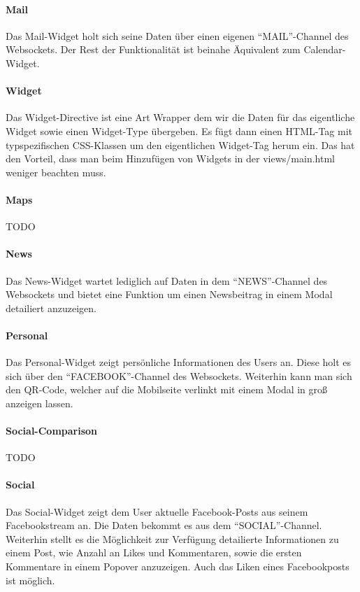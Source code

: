 \documentclass[10pt,a4paper]{report}
\newcommand{\code}[1]{{\fontfamily{cmvtt}\selectfont #1}}
\begin{document}
				\paragraph{Mail} 
					Das Mail-Widget holt sich seine Daten über einen eigenen "`MAIL"'-Channel des Websockets. Der Rest der Funktionalität ist beinahe Äquivalent zum Calendar-Widget.
				\paragraph{Widget}
					Das Widget-Directive ist eine Art Wrapper dem wir die Daten für das eigentliche Widget sowie einen Widget-Type übergeben. Es fügt dann einen HTML-Tag mit typspezifischen CSS-Klassen um den eigentlichen Widget-Tag herum ein. Das hat den Vorteil, dass man beim Hinzufügen von Widgets in der \code{views/main.html} weniger beachten muss.
				\paragraph{Maps}
					TODO
				\paragraph{News}
					Das News-Widget wartet lediglich auf Daten in dem "`NEWS"'-Channel des Websockets und bietet eine Funktion um einen Newsbeitrag in einem Modal detailiert anzuzeigen.
				\paragraph{Personal}
					Das Personal-Widget zeigt persönliche Informationen des Users an. Diese holt es sich über den "`FACEBOOK"'-Channel des Websockets. Weiterhin kann man sich den QR-Code, welcher auf die Mobilseite verlinkt mit einem Modal in groß anzeigen lassen.
				\paragraph{Social-Comparison}
					TODO
				\paragraph{Social}
					Das Social-Widget zeigt dem User aktuelle Facebook-Posts aus seinem Facebookstream an. Die Daten bekommt es aus dem "`SOCIAL"'-Channel. Weiterhin stellt es die Möglichkeit zur Verfügung detailierte Informationen zu einem Post, wie Anzahl an Likes und Kommentaren, sowie die ersten Kommentare in einem Popover anzuzeigen. Auch das Liken eines Facebookposts ist möglich.
\end{document}
